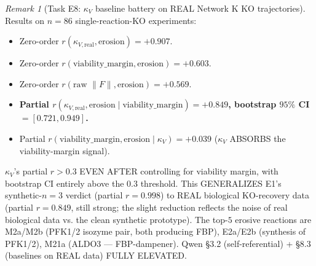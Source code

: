 \documentclass[11pt,a4paper]{article}
\theoremstyle{plain}
\theoremstyle{definition}
\theoremstyle{remark}
\newtheorem{remark}[theorem]{Remark}
\newcommand{\kk}{\kappa_{\!V}}
\begin{document}
\begin{remark}[Task E8: $\kk$ baseline battery on REAL Network K KO
trajectories]
Results on $n = 86$ single-reaction-KO experiments:
\begin{itemize}
\item Zero-order $r(\kappa_{V,\mathrm{real}}, \text{erosion}) = +0.907$.
\item Zero-order $r(\text{viability\_margin}, \text{erosion}) = +0.603$.
\item Zero-order $r(\text{raw } \|F\|, \text{erosion}) = +0.569$.
\item \textbf{Partial $r(\kappa_{V,\mathrm{real}}, \text{erosion} \mid
  \text{viability\_margin}) = +0.849$, bootstrap $95\%$ CI $= [0.721, 0.949]$.}
\item Partial $r(\text{viability\_margin}, \text{erosion} \mid \kk) =
  +0.039$ ($\kk$ ABSORBS the viability-margin signal).
\end{itemize}
$\kk$'s partial $r > 0.3$ EVEN AFTER controlling for viability margin,
with bootstrap CI entirely above the $0.3$ threshold. This GENERALIZES
E1's synthetic-$n{=}3$ verdict (partial $r = 0.998$) to REAL
biological KO-recovery data (partial $r = 0.849$, still strong; the
slight reduction reflects the noise of real biological data vs.
the clean synthetic prototype). The top-$5$ erosive reactions
are M2a/M2b (PFK1/2 isozyme pair, both producing FBP),
E2a/E2b (synthesis of PFK1/2), M21a (ALDO3 --- FBP-dampener).
Qwen \S 3.2 (self-referential) + \S 8.3 (baselines on REAL data)
FULLY ELEVATED.
\end{remark}
\end{document}
